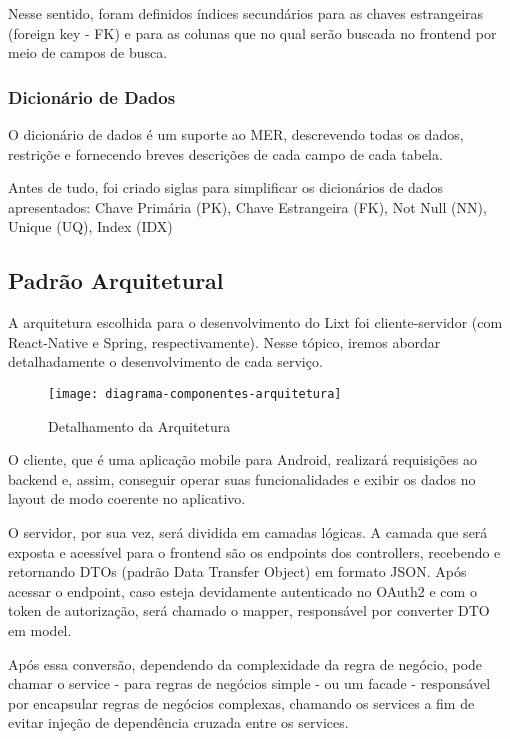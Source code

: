 Nesse sentido, foram definidos índices secundários para as chaves estrangeiras (foreign key - FK) e para as colunas que no qual serão buscada no frontend por meio de campos de busca.

\subsubsection{Dicionário de Dados}

O dicionário de dados é um suporte ao MER, descrevendo todas os dados, restriçõe e fornecendo breves descrições de cada campo de cada tabela.

Antes de tudo, foi criado siglas para simplificar os dicionários de dados apresentados: Chave Primária (PK), Chave Estrangeira (FK), Not Null (NN), Unique (UQ), Index (IDX)

\subsection{Padrão Arquitetural}

A arquitetura escolhida para o desenvolvimento do Lixt foi cliente-servidor (com React-Native e Spring, respectivamente). Nesse tópico, iremos abordar detalhadamente o desenvolvimento de cada serviço.

\begin{figure}[H]
  \centering
  \caption{Detalhamento da Arquitetura}
  \label{fig:diagrama-componentes-arquitetura}
  \texttt{[image: diagrama-componentes-arquitetura]}
\end{figure}

O cliente, que é uma aplicação mobile para Android, realizará requisições ao backend e, assim, conseguir operar suas funcionalidades e exibir os dados no layout de modo coerente no aplicativo.

O servidor, por sua vez, será dividida em camadas lógicas. A camada que será exposta e acessível para o frontend são os endpoints dos controllers, recebendo e retornando DTOs (padrão Data Transfer Object) em formato JSON. Após acessar o endpoint, caso esteja devidamente autenticado no OAuth2 e com o token de autorização, será chamado o mapper, responsável por converter DTO em model.

Após essa conversão, dependendo da complexidade da regra de negócio, pode chamar o service - para regras de negócios simple -  ou um facade - responsável por encapsular regras de negócios complexas, chamando os services a fim de evitar injeção de dependência cruzada entre os services. 

